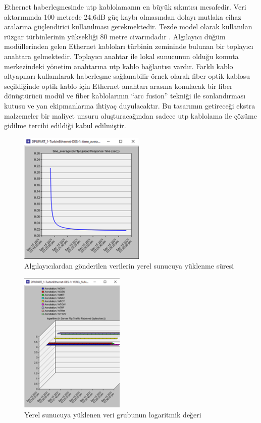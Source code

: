 Ethernet haberleşmesinde \gls{utp} kablolamanın en büyük sıkıntısı mesafedir. Veri aktarımında 100 metrede 24,6dB güç kaybı olmasından dolayı mutlaka cihaz aralarına güçlendirici kullanılması gerekmektedir. \cite{yilmazanalysis} Tezde model olarak kullanılan rüzgar türbinlerinin yüksekliği 80 metre civarındadır \cite{bauer_2010}. Algılayıcı düğüm modüllerinden gelen Ethernet kabloları türbinin zemininde bulunan bir toplayıcı anahtara gelmektedir. Toplayıcı anahtar ile lokal sunucunun olduğu komuta merkezindeki yönetim anahtarına \gls{utp} kablo bağlantısı vardır. Farklı kablo altyapıları kullanılarak haberleşme sağlanabilir örnek olarak fiber optik kablosu seçildiğinde optik kablo için Ethernet anahtarı arasına konulacak bir fiber dönüştürücü modül ve fiber kablolarının “arc fusion” tekniği ile sonlandırması kutusu ve yan ekipmanlarına ihtiyaç duyulacaktır. Bu tasarımın getireceği ekstra malzemeler bir maliyet unsuru oluşturacağından sadece \gls{utp} kablolama ile çözüme gidilme tercihi edildiği kabul edilmiştir.

\begin{figure}[htbp]
\centerline{\includegraphics[width=6cm]{Resim/sekil4-13.png}}
\caption{Algılayıcılardan gönderilen verilerin yerel sunucuya yüklenme süresi}
\label{fig:4-13}
\end{figure}


\begin{figure}[htbp]
\centerline{\includegraphics[width=5cm]{Resim/sekil4-14.png}}
\caption{Yerel sunucuya yüklenen veri grubunun logaritmik değeri}
\label{fig:4-14}
\end{figure}

